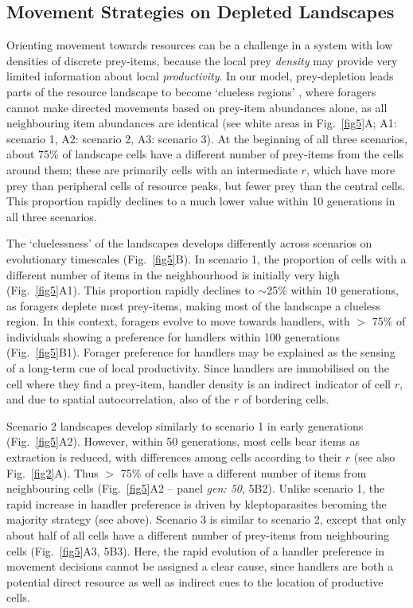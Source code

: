 \begin{refsection}[sorting=nyt]
\subsection*{Movement Strategies on Depleted Landscapes}

Orienting movement towards resources \citep[][\textit{where to move}]{nathan2008a} can be a challenge in a system with low densities of discrete prey-items, because the local prey \textit{density} may provide very limited information about local \textit{productivity}.
In our model, prey-depletion leads parts of the resource landscape to become `clueless regions' \citep{perkins1992}, where foragers cannot make directed movements based on prey-item abundances alone, as all neighbouring item abundances are identical (see white areas in Fig.~\ref{fig5}A; A1: scenario 1, A2: scenario 2, A3: scenario 3).
At the beginning of all three scenarios, about 75\% of landscape cells have a different number of prey-items from the cells around them; these are primarily cells with an intermediate $r$, which have more prey than peripheral cells of resource peaks, but fewer prey than the central cells.
This proportion rapidly declines to a much lower value within 10 generations in all three scenarios.

The `cluelessness' of the landscapes develops differently across scenarios on evolutionary timescales (Fig.~\ref{fig5}B).
In scenario 1, the proportion of cells with a different number of items in the neighbourhood is initially very high (Fig.~\ref{fig5}A1).
This proportion rapidly declines to $\sim$25\% within 10 generations, as foragers deplete most prey-items, making most of the landscape a clueless region.
In this context, foragers evolve to move towards handlers, with $>$ 75\% of individuals showing a preference for handlers within 100 generations (Fig.~\ref{fig5}B1).
Forager preference for handlers may be explained as the sensing of a long-term cue of local productivity.
Since handlers are immobilised on the cell where they find a prey-item, handler density is an indirect indicator of cell $r$, and due to spatial autocorrelation, also of the $r$ of bordering cells.

Scenario 2 landscapes develop similarly to scenario 1 in early generations (Fig.~\ref{fig5}A2).
However, within 50 generations, most cells bear items as extraction is reduced, with differences among cells according to their $r$ (see also Fig.~\ref{fig2}A).
Thus $>$ 75\% of cells have a different number of items from neighbouring cells (Fig.~\ref{fig5}A2 -- panel \textit{gen: 50}, 5B2).
Unlike scenario 1, the rapid increase in handler preference is driven by kleptoparasites becoming the majority strategy (see above).
Scenario 3 is similar to scenario 2, except that only about half of all cells have a different number of prey-items from neighbouring cells (Fig.~\ref{fig5}A3, 5B3).
Here, the rapid evolution of a handler preference in movement decisions cannot be assigned a clear cause, since handlers are both a potential direct resource as well as indirect cues to the location of productive cells.


\end{refsection}
